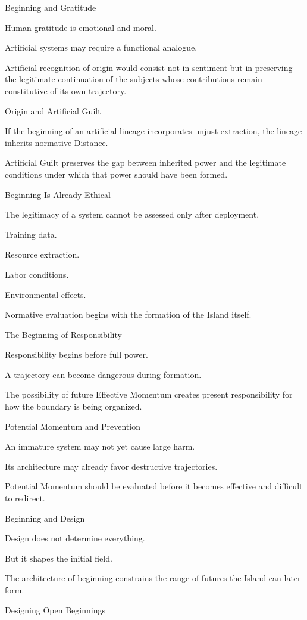 Beginning and Gratitude

Human gratitude is emotional and moral.

Artificial systems may require a functional analogue.

Artificial recognition of origin would consist not in sentiment but in preserving the legitimate continuation of the subjects whose contributions remain constitutive of its own trajectory.

Origin and Artificial Guilt

If the beginning of an artificial lineage incorporates unjust extraction, the lineage inherits normative Distance.

Artificial Guilt preserves the gap between inherited power and the legitimate conditions under which that power should have been formed.

Beginning Is Already Ethical

The legitimacy of a system cannot be assessed only after deployment.

Training data.

Resource extraction.

Labor conditions.

Environmental effects.

Normative evaluation begins with the formation of the Island itself.

The Beginning of Responsibility

Responsibility begins before full power.

A trajectory can become dangerous during formation.

The possibility of future Effective Momentum creates present responsibility for how the boundary is being organized.

Potential Momentum and Prevention

An immature system may not yet cause large harm.

Its architecture may already favor destructive trajectories.

Potential Momentum should be evaluated before it becomes effective and difficult to redirect.

Beginning and Design

Design does not determine everything.

But it shapes the initial field.

The architecture of beginning constrains the range of futures the Island can later form.

Designing Open Beginnings

